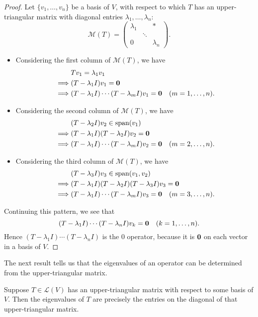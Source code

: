 \begin{proof}
Let $\{v_1,\dots,v_n\}$ be a basis of $V$, with respect to which $T$ has an upper-triangular matrix with diagonal entries $\lambda_1,\dots,\lambda_n$:
\[\mathcal{M}(T)=\begin{pmatrix}
\lambda_1&&\ast\\
&\ddots&\\
0&&\lambda_n
\end{pmatrix}.\]
\begin{itemize}
\item Considering the first column of $\mathcal{M}(T)$, we have
\begin{align*}
&Tv_1=\lambda_1v_1\\
\implies&(T-\lambda_1 I)v_1=\vb{0}\\
\implies&(T-\lambda_1 I)\cdots(T-\lambda_m I)v_1=\vb{0}\quad(m=1,\dots,n).
\end{align*}

\item Considering the second column of $\mathcal{M}(T)$, we have
\begin{align*}
&(T-\lambda_2 I)v_2\in\operatorname{span}(v_1)\\
\implies&(T-\lambda_1 I)(T-\lambda_2 I)v_2=\vb{0}\\
\implies&(T-\lambda_1 I)\cdots(T-\lambda_m I)v_2=\vb{0}\quad(m=2,\dots,n).
\end{align*}

\item Considering the third column of $\mathcal{M}(T)$, we have
\begin{align*}
&(T-\lambda_3 I)v_3\in\operatorname{span}(v_1,v_2)\\
\implies&(T-\lambda_1 I)(T-\lambda_2 I)(T-\lambda_3 I)v_3=\vb{0}\\
\implies&(T-\lambda_1 I)\cdots(T-\lambda_m I)v_3=\vb{0}\quad(m=3,\dots,n).
\end{align*}
\end{itemize}

Continuing this pattern, we see that
\[(T-\lambda_1 I)\cdots(T-\lambda_n I)v_k=\vb{0}\quad(k=1,\dots,n).\]
Hence $(T-\lambda_1 I)\cdots(T-\lambda_n I)$ is the $0$ operator, because it is $\vb{0}$ on each vector in a basis of $V$.
\end{proof}

The next result tells us that the eigenvalues of an operator can be determined from the upper-triangular matrix.

\begin{proposition}\label{prop:upper-triangular-matrix-eigenvalues}
Suppose $T\in\mathcal{L}(V)$ has an upper-triangular matrix with respect to some basis of $V$. Then the eigenvalues of $T$ are precisely the entries on the diagonal of that upper-triangular matrix.
\end{proposition}


